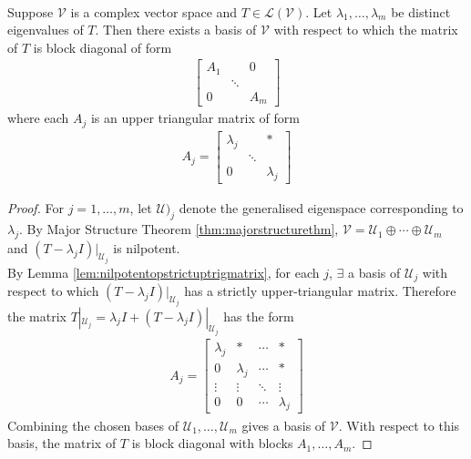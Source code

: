 \begin{theorem} \label{thm:triangularformthmforlinopoverc} \\
Suppose $\mathcal{V}$ is a complex vector space and $T \in \mathcal{L}(\mathcal{V})$. Let $\lambda_1, \ldots, \lambda_m$ be distinct eigenvalues of $T$. Then there exists a basis of $\mathcal{V}$ with respect to which the matrix of $T$ is block diagonal of form
\begin{align}
\begin{bmatrix}
A_1 & & 0 \\
 & \ddots & \\
0 & & A_m
\end{bmatrix} \nonumber
\end{align}
where each $A_j$ is an upper triangular matrix of form
\begin{align}
A_j = \begin{bmatrix}
\lambda_j & & * \\
& \ddots & \\
0 & & \lambda_j
\end{bmatrix} \nonumber
\end{align}
\begin{proof} For $j=1, \ldots, m$, let $\mathcal{U})_j$ denote the generalised eigenspace corresponding to $\lambda_j$. By Major Structure Theorem \ref{thm:majorstructurethm}, $\mathcal{V} = \mathcal{U}_1 \oplus \cdots \oplus \mathcal{U}_m$ and $(T - \lambda_j I)|_{\mathcal{U}_j}$ is nilpotent.\\
By Lemma \ref{lem:nilpotentopstrictuptrigmatrix}, for each $j$, $\exists$ a basis of $\mathcal{U}_j$ with respect to which $(T - \lambda_j I)|_{\mathcal{U}_j}$ has a strictly upper-triangular matrix. Therefore the matrix $T|_{\mathcal{U}_j} = \lambda_j I + (T - \lambda_j I)|_{\mathcal{U}_j}$ has the form
\begin{align}
A_j =
\begin{bmatrix}
\lambda_j & * & \cdots & * \\
0 & \lambda_j & \cdots & * \\
\vdots & \vdots & \ddots & \vdots \\
0 & 0 & \cdots & \lambda_j
\end{bmatrix} \nonumber
\end{align}
Combining the chosen bases of $\mathcal{U}_1, \ldots, \mathcal{U}_m$ gives a basis of $\mathcal{V}$. With respect to this basis, the matrix of $T$ is block diagonal with blocks $A_1, \ldots, A_m$.
\end{proof}
\end{theorem}


